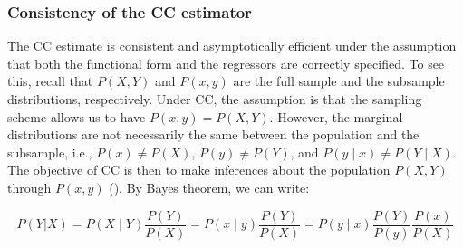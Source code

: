 


\subsubsection{Consistency of the CC estimator}
The CC estimate is consistent and asymptotically efficient under the assumption that both the functional form and the regressors are correctly specified. To see this, recall that $P(X, Y)$ and $P(x, y)$ are the full sample and the subsample distributions, respectively. Under CC, the assumption is that the sampling scheme allows us to have $P(x,y) = P(X, Y)$. However, the marginal distributions are not necessarily the same between the population and the subsample, i.e., $P(x)\neq P(X)$, $P(y)\neq P(Y)$, and $P(y \mid x)\neq P(Y \mid X)$. The objective of CC is then to make inferences about the population $P(X, Y)$ through $P(x, y)$ (\cite{king2001logistic}). By Bayes theorem, we can write:

\begin{equation}
    P(Y|X)= P(X \mid Y) \frac{P(Y)}{P(X)}= P(x \mid y) \frac{P(Y)}{P(X)} =  P(y \mid x) \frac{P(Y)}{P(y)} \frac{P(x)}{P(X)}
\end{equation}

